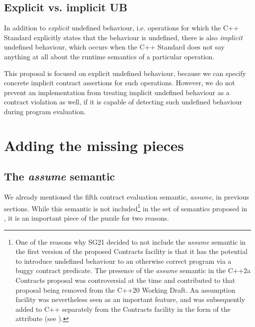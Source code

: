 \subsection{Explicit vs. implicit UB}

In addition to \emph{explicit} undefined behaviour, i.e. operations for which the C++ Standard explicitly states that the behaviour is undefined, there is also \emph{implicit} undefined behaviour, which occurs when the C++ Standard does not say anything at all about the runtime semantics of a particular operation.

This proposal is focused on explicit undefined behaviour, because we can specify concrete implicit contract assertions for such operations. However, we do not prevent an implementation from treating implicit undefined behaviour as a contract violation as well, if it is capable of detecting such undefined behaviour during program evaluation.

\section{Adding the missing pieces}

\subsection{The \emph{assume} semantic}
\label{assume}

We already mentioned the fifth contract evaluation semantic, \emph{assume}, in previous sections. While this semantic is not included\footnote{One of the reasons why SG21 decided to not include the \emph{assume} semantic in the first version of the proposed Contracts facility is that it has the potential to introduce undefined behaviour to an otherwise correct program via a buggy contract predicate. The presence of the \emph{assume} semantic in the C++2a Contracts proposal \cite{P0542R5} was controversial at the time and contributed to that proposal being removed from the C++20 Working Draft. An assumption facility was nevertheless seen as an important feature, and was subsequently added to C++ separately from the Contracts facility in the form of the \tcode{[[assume]]} attribute (see \cite{P1774R8}).}  in the set of semantics proposed in \cite{P2900R8}, it is an important piece of the puzzle for two reasons.

